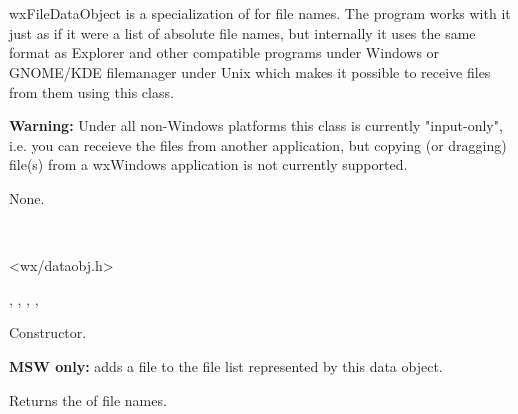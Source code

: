 \section{}\label{wxfiledataobject}

wxFileDataObject is a specialization of  
for file names. The program works with it just as if it were a list of absolute file
names, but internally it uses the same format as
Explorer and other compatible programs under Windows or GNOME/KDE filemanager
under Unix which makes it possible to receive files from them using this
class.

{\bf Warning:} Under all non-Windows platforms this class is currently
"input-only", i.e. you can receieve the files from another application, but
copying (or dragging) file(s) from a wxWindows application is not currently
supported.


None.


\\


<wx/dataobj.h>


, 
, 
, 
, 


\label{wxfiledataobjectwxfiledataobject}


Constructor.

\label{wxfiledataobjectaddfile}


{\bf MSW only:} adds a file to the file list represented by this data object.

\label{wxfiledataobjectgetfilenames}


Returns the  of file names.

